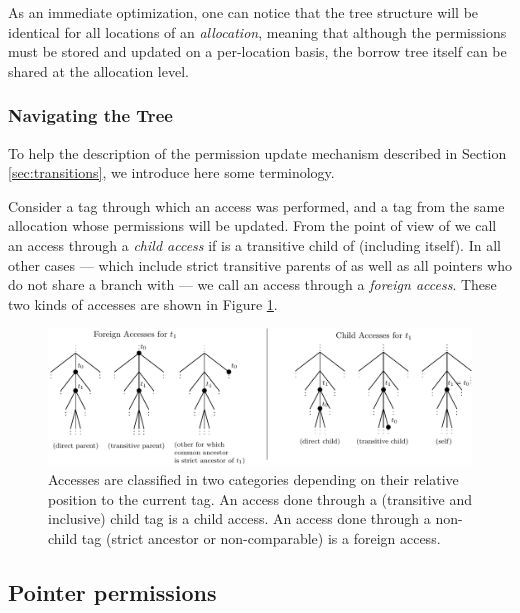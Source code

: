 \documentclass[a4paper,11pt]{article}
\theoremstyle{plain}
\theoremstyle{definition}
\theoremstyle{remark}
\newcommand{\tcode}[1]{\rstinline{#1}}
\begin{document}
As an immediate optimization, one can notice that the tree structure will
be identical for all locations of an \textit{allocation}, meaning that although
the permissions must be stored and updated on a per-location basis, the
borrow tree itself can be shared at the allocation level.

\subsubsection{Navigating the Tree}

To help the description of the permission update mechanism described in
Section \ref{sec:transitions}, we introduce here some terminology.

Consider a tag \tcode{t0} through which an access was performed, and a tag
\tcode{t1} from the same allocation whose permissions will be updated. From the point
of view of \tcode{t1} we call an access through \tcode{t0} a \textit{child access}
if \tcode{t0} is a transitive child of \tcode{t1} (including \tcode{t1} itself).
In all other cases --- which include strict transitive parents of \tcode{t1} as well as
all pointers who do not share a branch with \tcode{t1} --- we call an access through
\tcode{t0} a \textit{foreign access}. These two kinds of accesses are shown
in Figure \ref{fig:kinds-of-accesses}.

\begin{figure}
    \includegraphics[width=\textwidth]{../figs/accesses-kinds.pdf}
    \caption{Accesses are classified in two categories depending on their relative position
    to the current tag. An access done through a (transitive and inclusive) child tag is a child access.
    An access done through a non-child tag (strict ancestor or non-comparable) is a foreign access.}
    \label{fig:kinds-of-accesses}
\end{figure}


\subsection{Pointer permissions}
\end{document}
